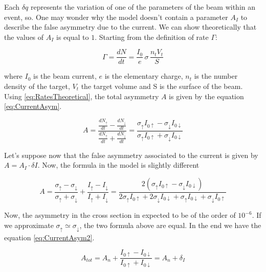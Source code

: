 Each $\delta q$ represents the variation of one of the parameters of the beam within an event, so.
One may wonder why the model doesn't contain a parameter $A_{I}$ to describe the false asymmetry due to the current. We can show theoretically that the values of $A_{I}$ is equal to $1$. Starting from the definition of rate $\Gamma$:

\begin{equation} \label{eq:RatesTheoretical}
\Gamma = \frac{dN}{dt} = \frac{I_{0}}{e} \, \sigma \, \frac{n_{t} V_t}{S}
\end{equation}

where $I_{0}$ is the beam current, $e$ is the elementary charge, $n_{t}$ is the number density of the target, $V_{t}$ the target volume and S is the surface of the beam. Using \ref{eq:RatesTheoretical}, the total asymmetry $A$ is given by the equation \ref{eq:CurrentAsym}.

\begin{equation} \label{eq:CurrentAsym}
A = \dfrac{\frac{dN_{\uparrow}}{dt} - \frac{dN_{\downarrow}}{dt}}{\frac{dN_{\uparrow}}{dt} + \frac{dN_{\downarrow}}{dt}} = \dfrac{\sigma_{\uparrow} I_{0 \uparrow} - \sigma_{\downarrow} I_{0 \downarrow}}{\sigma_{\uparrow} I_{0 \uparrow} + \sigma_{\downarrow} I_{0 \downarrow}}
\end{equation}

Let's suppose now that the false asymmetry associated to the current is given by $A = A_{I} \cdot \delta I$.  
Now, the formula in the model is slightly different

\begin{equation}
A = \dfrac{\sigma_{\uparrow} - \sigma_{\downarrow}}{\sigma_{\uparrow} + \sigma_{\downarrow}} + \dfrac{I_{\uparrow} - I_{\downarrow}}{I_{\uparrow} + I_{\downarrow}} = \dfrac{2(\sigma_{\uparrow} I_{0 \uparrow} - \sigma_{\downarrow} I_{0 \downarrow})}{ 2\sigma_{\uparrow} I_{0 \uparrow} + 2\sigma_{\downarrow} I_{0 \downarrow} + \sigma_{\uparrow} I_{0 \downarrow} + \sigma_{\downarrow} I_{0 \uparrow}  }
\end{equation}

Now, the asymmetry in the cross section in expected to be of the order of $10^{-6}$. 
If we approximate $\sigma_{\uparrow} \simeq \sigma_{\downarrow}$, the two formula above are equal. In the end we have the equation \ref{eq:CurrentAsym2}.

\begin{equation} \label{eq:CurrentAsym2}
A_{tot} = A_{n} + \dfrac{I_{0 \uparrow} - I_{0 \downarrow}}{I_{0 \uparrow} + I_{0 \downarrow}} = A_{n} + \delta_{I}
\end{equation}

